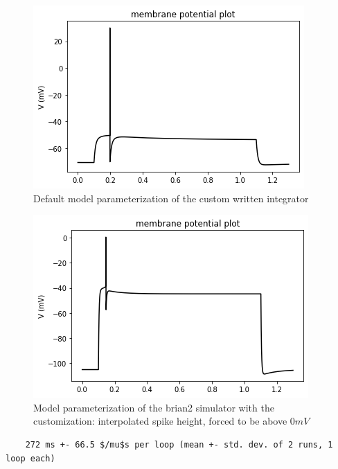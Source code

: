 \begin{center}
\begin{figure}
\includegraphics{figures/backend_check_files/backend_check_4_2}
\caption{Default model parameterization of the custom written integrator}
\end{figure}
\end{center}


\begin{center}
\begin{figure}

\includegraphics{figures/backend_check_files/backend_check_12_10}
\caption{Model parameterization of the brian2 simulator with the customization: interpolated spike height, forced to be above $0mV$}
\end{figure}

\end{center}
    
\begin{verbatim}
    272 ms +- 66.5 $/mu$s per loop (mean +- std. dev. of 2 runs, 1 loop each)
\end{verbatim}

